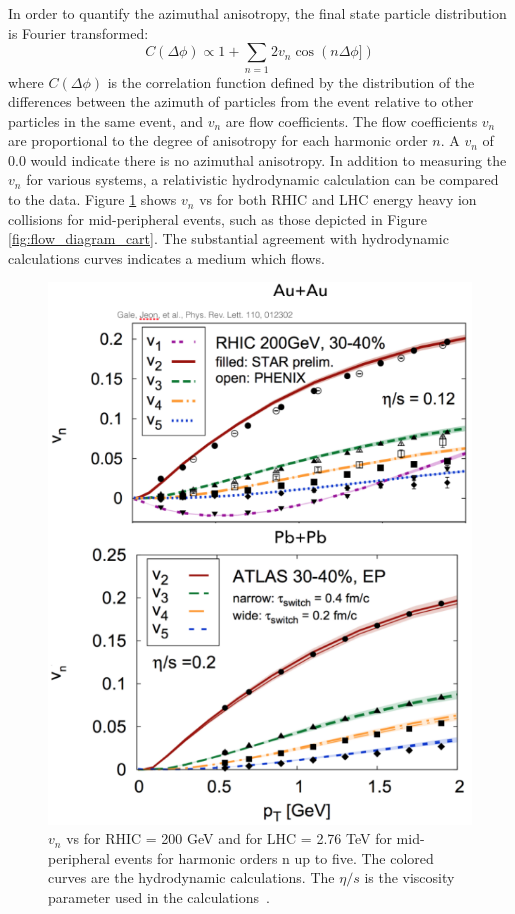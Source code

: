 In order to quantify the azimuthal anisotropy, the final state particle distribution is Fourier transformed:
\begin{equation}\label{eqn:dndphi}
  C(\Delta\phi) \propto 1 + \sum_{n=1}2 v_{n}\cos(n\Delta\phi]) 
\end{equation}
where $C(\Delta\phi)$ is the correlation function defined by the distribution of the differences between the azimuth of particles from the event relative to other particles in the same event, and $v_n$ are flow coefficients. The flow coefficients $v_n$ are proportional to the degree of anisotropy for each harmonic order $n$. A $v_n$ of 0.0 would indicate there is no azimuthal anisotropy. In addition to measuring the $v_n$ for various systems, a relativistic hydrodynamic calculation can be compared to the data. Figure \ref{fig:vn_aa_hydro} shows $v_n$ vs \pt for both RHIC and LHC energy heavy ion collisions for mid-peripheral events, such as those depicted in Figure \ref{fig:flow_diagram_cart}. The substantial agreement with hydrodynamic calculations  curves indicates a medium which flows.

\begin{figure}[!ht]
\begin{center}
\includegraphics[width=0.65\linewidth]{figs/vn_aa_pbpb_hydro.PNG}
\caption{$v_n$ vs \pt for RHIC \auau \sqsn = 200 GeV and for LHC \pbpb \sqsn = 2.76 TeV for mid-peripheral events for harmonic orders n up to five. The colored curves are the hydrodynamic calculations. The $\eta/s$ is the viscosity parameter used in the calculations~\cite{PhysRevLett.110.012302}.}
\end{center}
\label{fig:vn_aa_hydro}
\end{figure}

